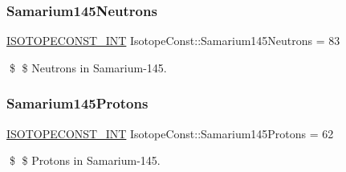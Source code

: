 \subsubsection{\texorpdfstring{Samarium145\+Neutrons}{Samarium145Neutrons}}
{\footnotesize\ttfamily \mbox{\hyperlink{group___isotope_const-_macros_ga5f18360b3e99483a35c32d789e62621c}{I\+S\+O\+T\+O\+P\+E\+C\+O\+N\+S\+T\+\_\+\+I\+NT}} Isotope\+Const\+::\+Samarium145\+Neutrons = 83}

\$ \$ Neutrons in Samarium-\/145. \mbox{\label{group___isotope_const-_samarium-_sm145_gaf61e64e167442d8c949a19465b5dec0b}} 
\subsubsection{\texorpdfstring{Samarium145\+Protons}{Samarium145Protons}}
{\footnotesize\ttfamily \mbox{\hyperlink{group___isotope_const-_macros_ga5f18360b3e99483a35c32d789e62621c}{I\+S\+O\+T\+O\+P\+E\+C\+O\+N\+S\+T\+\_\+\+I\+NT}} Isotope\+Const\+::\+Samarium145\+Protons = 62}

\$ \$ Protons in Samarium-\/145. 